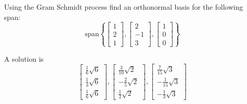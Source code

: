 \documentclass{ximera}
\begin{document}
\begin{problem}\label{prob:use_GS_on_span}
Using the Gram Schmidt process find an
orthonormal basis for the following span:
 \[
\mbox{span} \left\{ \left[
\begin{array}{r}
1 \\
2 \\
1
\end{array}
\right] ,\left[
\begin{array}{r}
2 \\
-1 \\
3
\end{array}
\right] , \left[
\begin{array}{r}
1 \\
0 \\
0
\end{array}
\right] \right\}
\]
\begin{hint}
A solution is
\[
\left[
\begin{array}{c}
\frac{1}{6}\sqrt{6} \\
\frac{1}{3}\sqrt{6} \\
\frac{1}{6}\sqrt{6}
\end{array}
\right] ,\left[
\begin{array}{c}
\frac{3}{10}\sqrt{2} \\
-\frac{2}{5}\sqrt{2} \\
\frac{1}{2}\sqrt{2}
\end{array}
\right] ,\left[
\begin{array}{c}
\frac{7}{15}\sqrt{3} \\
-\frac{1}{15}\sqrt{3} \\
-\frac{1}{3}\sqrt{3}
\end{array}
\right]
\]
\end{hint}
\end{problem}
\end{document}
